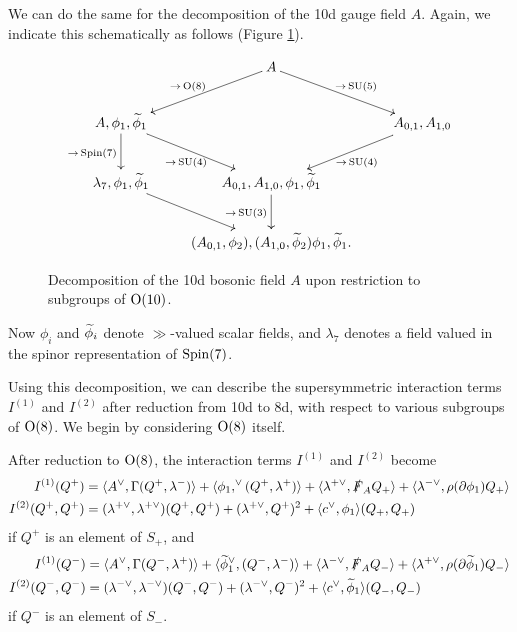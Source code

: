 \documentclass[10pt, oneside]{article}
\begin{document}
We can do the same for the decomposition of the 10d gauge field $A$.  Again, we indicate this schematically as follows (Figure \ref{fig:8dbosondecomp}).
\begin{figure}[!h]
\[\xymatrix{
&A \ar[dl]_{\to\,  \mr{O}(8)} \ar[dr]^{\to\,  \SU(5)} & \\
A,\phi_1, \wt \phi_1 \ar[dr]_{\to\,  \SU(4)} \ar[d]_{\to\,  \Spin(7)} &&A_{0,1}, A_{1,0} \ar[dl]^{\to\,  \SU(4)} \\
\lambda_7, \phi_1, \wt \phi_1 \ar[dr] &A_{0,1},A_{1,0},\phi_1, \wt \phi_1 \ar[d]_{\to\,  \SU(3)} & \\
&(A_{0,1}, \phi_2) ,(A_{1,0}, \wt \phi_2) \phi_1, \wt \phi_1.&
}
\]
\caption{Decomposition of the 10d bosonic field $A$ upon restriction to subgroups of $\mathrm{O}(10)$.}
\label{fig:8dbosondecomp}
\end{figure}
Now $\phi_i$ and $\widetilde{\phi}_i$ denote $\gg$-valued scalar fields, and $\lambda_7$ denotes a field valued in the spinor representation of $\mathrm{Spin}(7)$.

Using this decomposition, we can describe the supersymmetric interaction terms $I^{(1)}$ and $I^{(2)}$ after reduction from 10d to 8d, with respect to various subgroups of $\mathrm{O}(8)$.  We begin by considering $\mathrm{O}(8)$ itself.

\begin{prop} \label{O8_decomposition_of_susy_prop}
After reduction to $\mathrm{O}(8)$, the interaction terms $I^{(1)}$ and $I^{(2)}$ become
\begin{align*}
I^{(1)}(Q^+) &= \langle A^\vee, \Gamma(Q^+, \lambda^-)\rangle + \langle \phi_1,^\vee (Q^+,\lambda^+)\rangle + \langle \lambda^{+\vee}, \slashed{F}_A Q_+ \rangle + \langle \lambda^{-\vee}, \rho(\partial \phi_1)Q_+ \rangle\\
I^{(2)}(Q^+, Q^+) &= (\lambda^{+\vee}, \lambda^{+\vee})(Q^+,Q^+) + (\lambda^{+\vee},Q^+)^2 + \langle c^\vee, \phi_1\rangle(Q_+,Q_+)
\end{align*}
if $Q^+$ is an element of $S_+$, and
\begin{align*}
I^{(1)}(Q^-) &= \langle A^\vee, \Gamma(Q^-, \lambda^+)\rangle + \langle \widetilde{\phi}_1^\vee, (Q^-,\lambda^-)\rangle+ \langle \lambda^{-\vee}, \slashed{F}_A Q_- \rangle + \langle \lambda^{+\vee}, \rho(\partial \widetilde{\phi}_1)Q_- \rangle\\
I^{(2)}(Q^-, Q^-) &= (\lambda^{-\vee}, \lambda^{-\vee})(Q^-,Q^-) + (\lambda^{-\vee},Q^-)^2 + \langle c^\vee, \widetilde{\phi}_1\rangle(Q_-,Q_-)
\end{align*}
if $Q^-$ is an element of $S_-$.
\end{prop}
\end{document}
